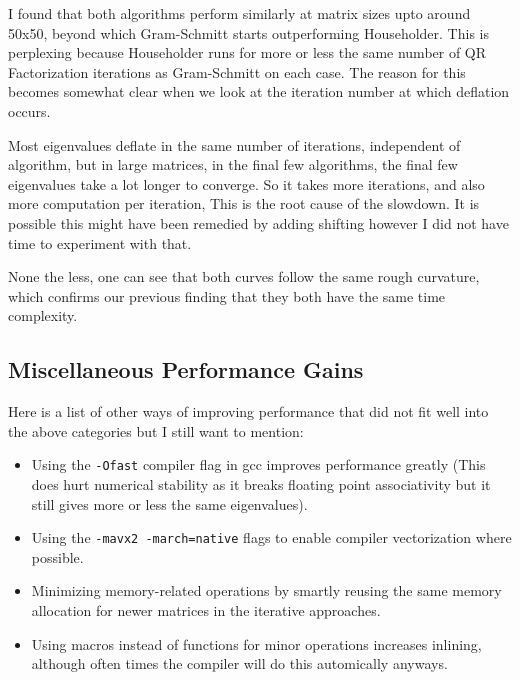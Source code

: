 \documentclass[12pt,a4paper]{article}
\begin{document}
\bigskip

I found that both algorithms perform similarly at matrix sizes upto around 50x50, beyond which Gram-Schmitt starts outperforming Householder. This is perplexing because Householder runs for more or less the same number of QR Factorization iterations as Gram-Schmitt on each case. The reason for this becomes somewhat clear when we look at the iteration number at which deflation occurs.

Most eigenvalues deflate in the same number of iterations, independent of algorithm, but in large matrices, in the final few algorithms, the final few eigenvalues take a lot longer to converge. So it takes more iterations, and also more computation per iteration, This is the root cause of the slowdown. It is possible this might have been remedied by adding shifting however I did not have time to experiment with that.

None the less, one can see that both curves follow the same rough curvature, which confirms our previous finding that they both have the same time complexity.

\subsection{Miscellaneous Performance Gains}

Here is a list of other ways of improving performance that did not fit well into the above categories but I still want to mention:

\begin{itemize}
    \item Using the \verb|-Ofast| compiler flag in gcc improves performance greatly (This does hurt numerical stability as it breaks floating point associativity but it still gives more or less the same eigenvalues).
    
    \item Using the \verb|-mavx2 -march=native| flags to enable compiler vectorization where possible.
    
    \item Minimizing memory-related operations by smartly reusing the same memory allocation for newer matrices in the iterative approaches.
    
    \item Using macros instead of functions for minor operations increases inlining, although often times the compiler will do this automically anyways.
\end{itemize}
\end{document}
